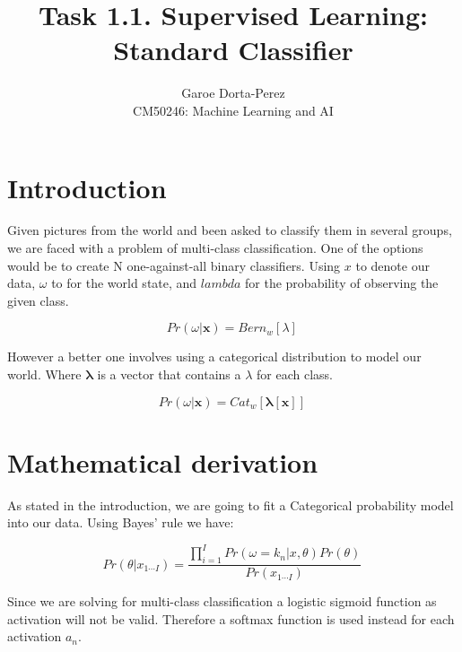 \documentclass[12pt]{article}
\begin{document}
  
\title{Task 1.1. Supervised Learning: Standard Classifier}
\author{Garoe Dorta-Perez\\
CM50246: Machine Learning and AI}
 
\maketitle
 
\section{Introduction}
 
Given pictures from the world and been asked to classify them in several groups, we are faced with a problem of multi-class classification.
One of the options would be to create N one-against-all binary classifiers. Using $x$ to denote our data, $\omega$ to for the world state, and $lambda$ for the probability of observing the given class.

\begin{equation}
\label{bernoulliDistribution}
Pr(\omega|\mathbf{x}) = Bern_{w}[\lambda]\,
\end{equation}

However a better one involves using a categorical distribution to model our world. Where $\bm{\lambda}$ is a vector that contains a $\lambda$ for each class.

\begin{equation}
\label{categoricalDistribution}
Pr(\omega|\mathbf{x}) = Cat_{w}[\bm{\lambda}[\mathbf{x}]]\,
\end{equation}

\section{Mathematical derivation}

As stated in the introduction, we are going to fit a Categorical probability model into our data. 
Using Bayes' rule we have:

\begin{equation}
\label{bayes}
Pr(\theta | x_{1 \cdots I}) = \frac{\prod_{i = 1}^{I} Pr(\omega = k_{n} | x, \theta) Pr(\theta)} {Pr(x_{1 \cdots I})}\,
\end{equation}

Since we are solving for multi-class classification a logistic sigmoid function as activation will not be valid.
Therefore a softmax function is used instead for each activation $a_{n}$.
\end{document}
